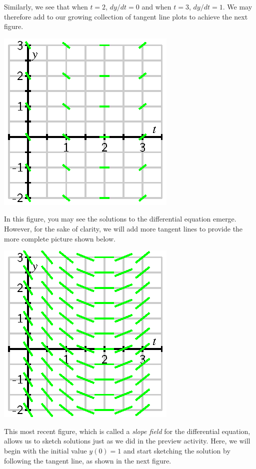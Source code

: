 Similarly, we see that when $t=2$, $dy/dt = 0$ and when $t=3$,
$dy/dt=1$.  We may therefore add to our growing collection of tangent line plots to achieve the next figure.

\begin{center}
  \includegraphics{figures/7_2_field_3.eps}
\end{center}

In this figure, you may see the solutions to the differential
equation emerge.  However, for the sake of clarity, we will
add more tangent lines to provide the more complete picture shown below.

\begin{center}
  \includegraphics{figures/7_2_field_23a.eps}
\end{center}

This most recent figure, which is called a {\em slope field} for the differential
equation, allows us to sketch
solutions just as we did in the preview activity.  Here, we will begin with the
initial value $y(0) = 1$ and start sketching the solution by following
the tangent line, as shown in the next figure.

